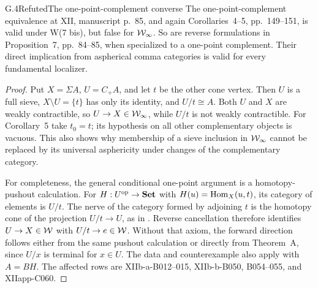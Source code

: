 \begin{claim}{G.4}{Refuted}{The one-point-complement converse}
The one-point-complement equivalence at XII, manuscript p.~85, and again Corollaries~4--5, pp.~149--151, is valid under W(7 bis), but false for $\mathcal{W}_{\infty}$. So are reverse formulations in Proposition~7, pp.~84--85, when specialized to a one-point complement. Their direct implication from aspherical comma categories is valid for every fundamental localizer.
\end{claim}
\begin{proof}
Put $X=\Sigma A$, $U=C_+A$, and let $t$ be the other cone vertex. Then $U$ is a full sieve, $X\setminus U=\{t\}$ has only its identity, and $U/t\cong A$. Both $U$ and $X$ are weakly contractible, so $U\to X\in\mathcal{W}_{\infty}$, while $U/t$ is not weakly contractible. For Corollary~5 take $t_0=t$; its hypothesis on all other complementary objects is vacuous. This also shows why membership of a sieve inclusion in $\mathcal{W}_{\infty}$ cannot be replaced by its universal asphericity under changes of the complementary category.

For completeness, the general conditional one-point argument is a homotopy-pushout calculation. For $H:U^{\mathrm{op}}\to\mathbf{Set}$ with $H(u)=\operatorname{Hom}_X(u,t)$, its category of elements is $U/t$. The nerve of the category formed by adjoining $t$ is the homotopy cone of the projection $U/t\to U$, as in . Reverse cancellation therefore identifies $U\to X\in\mathcal{W}$ with $U/t\to e\in\mathcal{W}$. Without that axiom, the forward direction follows either from the same pushout calculation or directly from Theorem~A, since $U/x$ is terminal for $x\in U$. The data and counterexample also apply with $A=BH$. The affected rows are XIIb-a-B012--015, XIIb-b-B050, B054--055, and XIIapp-C060.
\end{proof}

